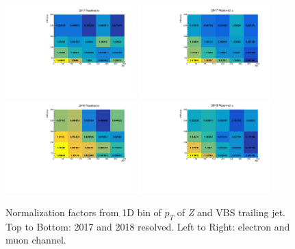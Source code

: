 \begin{figure}
  \centering
  \includegraphics[width=0.45\textwidth]{analysis_plots/dyjet_norm_2d/cr_vjets_e_sf_from_2017_zjj.pdf}
  \includegraphics[width=0.45\textwidth]{analysis_plots/dyjet_norm_2d/cr_vjets_mu_sf_from_2017_zjj.pdf}\\
  \includegraphics[width=0.45\textwidth]{analysis_plots/dyjet_norm_2d/cr_vjets_e_sf_from_2018_zjj.pdf}
  \includegraphics[width=0.45\textwidth]{analysis_plots/dyjet_norm_2d/cr_vjets_mu_sf_from_2018_zjj.pdf}
  \caption[Normalization factors from 1D bin of \( p_T \) of \textit{Z}
    and VBS trailing jet]%
  {Normalization factors from 1D bin of \( p_T \) of \textit{Z}
    and VBS trailing jet. Top to Bottom: 2017 and 2018 resolved.
    Left to Right: electron and muon channel.}%
  \label{fig:norm-factors-2d}
\end{figure}


